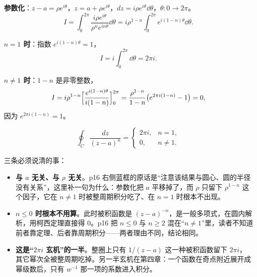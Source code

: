 \documentclass[11pt]{ctexart}
\let\origsubhdr\subhdr
\renewcommand{\subhdr}[1]{\par\needspace{4\baselineskip}\origsubhdr{#1}}
\renewcommand{\qbreak}{\needspace{0.45\textheight}}
\begin{document}

\qbreak
{}


\textbf{参数化}：$z-a=\rho e^{i\theta}$，$z=a+\rho e^{i\theta}$，$dz=i\rho e^{i\theta}\dd\theta$，$\theta:0\to2\pi$。
\begin{equation}\label{eq:basint}
I=\int_0^{2\pi}\frac{i\rho e^{i\theta}}{\rho^{n}e^{in\theta}}\dd\theta
=i\rho^{1-n}\int_0^{2\pi}e^{i(1-n)\theta}\dd\theta .
\end{equation}

\textbf{$n=1$ 时}：指数 $e^{i(1-n)\theta}=1$，
\[ I=i\int_0^{2\pi}\dd\theta=2\pi i . \]

\textbf{$n\ne1$ 时}：$1-n$ 是非零整数，
\[ I=i\rho^{1-n}\Bigl[\frac{e^{i(1-n)\theta}}{i(1-n)}\Bigr]_0^{2\pi}
=\frac{\rho^{1-n}}{1-n}\bigl(e^{2\pi i(1-n)}-1\bigr)=0 , \]
因为 $e^{2\pi i(1-n)}=1$。

\begin{equation}\label{eq:main}
\boxed{\;\oint_C\frac{dz}{(z-a)^{n}}=
\begin{cases}2\pi i, & n=1,\\[2pt] 0, & n\ne1.\end{cases}\;}
\end{equation}

三条必须说清的事：

\begin{itemize}
\item[(1)] \textbf{与 $a$ 无关、与 $\rho$ 无关}。p16 右侧蓝框的原话是“注意该结果与圆心、圆的半径没有关系”，这里补一句为什么：参数化把 $a$ 平移掉了，而 $\rho$ 只留下 $\rho^{1-n}$ 这个因子，它在 $n\ne1$ 时被整周期积分吃了、在 $n=1$ 时根本不出现。
\item[(2)] \textbf{$n\le0$ 时根本不用算}。此时被积函数是 $(z-a)^{-n}$，是一般多项式，在圆内解析，用柯西定理直接得 $0$。p16 把 $n\le0$ 与 $n\ge2$ 混在“$n\ne1$”里，读者不知道前者靠定理、后者靠周期积分——两者理由不同，结论相同。
\item[(3)] \textbf{这是“$2\pi i$ 玄机”的一半}。整圈上只有 $1/(z-a)$ 这一种被积函数留下 $2\pi i$，其它幂次全被整周期吃掉。另一半玄机在第四章：一个函数在奇点附近展开成幂级数后，只有 $w^{-1}$ 那一项的系数进入积分。
\end{itemize}
\end{document}
